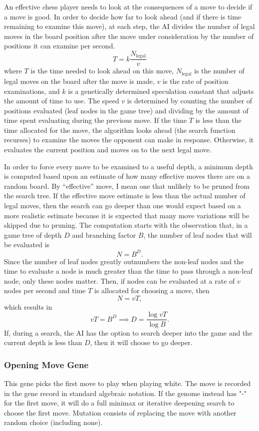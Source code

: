 \documentclass[letterpaper]{article}
\renewcommand{\_}{\allowbreak\textunderscore\allowbreak}
\begin{document}
An effective chess player needs to look at the consequences of a move to decide if a move is good. In order to decide how far to look ahead (and if there is time remaining to examine this move), at each step, the AI divides the number of legal moves in the board position after the move under consideration by the number of positions it can examine per second.
\[
T = k\frac{N_{\textrm{legal}}}{v}
\]
where \(T\) is the time needed to look ahead on this move, \(N_{\textrm{legal}}\) is the number of legal moves on the board after the move is made, \(v\) is the rate of position examinations, and \(k\) is a genetically determined speculation constant that adjusts the amount of time to use. The speed \(v\) is determined by counting the number of positions evaluated (leaf nodes in the game tree) and dividing by the amount of time spent evaluating during the previous move. If the time \(T\) is less than the time allocated for the move, the algorithm looks ahead (the search function recurses) to examine the moves the opponent can make in response. Otherwise, it evaluates the current position and moves on to the next legal move.

In order to force every move to be examined to a useful depth, a minimum depth is computed based upon an estimate of how many effective moves there are on a random board. By ``effective'' move, I mean one that unlikely to be pruned from the search tree. If the effective move estimate is less than the actual number of legal moves, then the search can go deeper than one would expect based on a more realistic estimate because it is expected that many move variations will be skipped due to pruning. The computation starts with the observation that, in a game tree of depth \(D\) and branching factor \(B\), the number of leaf nodes that will be evaluated is
\[
N = B^D.
\]
Since the number of leaf nodes greatly outnumbers the non-leaf nodes and the time to evaluate a node is much greater than the time to pass through a non-leaf node, only these nodes matter. Then, if nodes can be evaluated at a rate of \(v\) nodes per second and time \(T\) is allocated for choosing a move, then
\[
N = vT,
\]
which results in
\[
vT = B^D \implies D = \frac{\log{vT}}{\log{B}}.
\]
If, during a search, the AI has the option to search deeper into the game and the current depth is less than \(D\), then it will choose to go deeper.

\subsubsection{Opening Move Gene}
This gene picks the first move to play when playing white. The move is recorded in the gene record in standard algebraic notation. If the genome instead has "-" for the first move, it will do a full minimax or iterative deepening search to choose the first move. Mutation consists of replacing the move with another random choice (including none).
\end{document}
